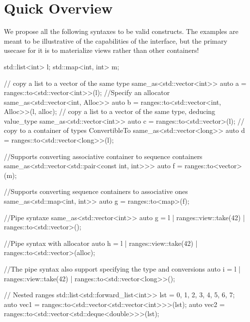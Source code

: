 \documentclass{wg21}
\begin{document}
\section{Quick Overview}
We propose all the following syntaxes to be valid constructs.
The examples are meant to be illustrative of the capabilities of the interface, but the primary usecase for it is to materialize views rather than other containers!

\begin{colorblock}
std::list<int>  l;
std::map<int, int> m;

// copy a list to a vector of the same type
same_as<std::vector<int>> auto a = ranges::to<std::vector<int>>(l);
//Specify an allocator
same_as<std::vector<int, Alloc>> auto b = ranges::to<std::vector<int, Alloc>>(l, alloc);
// copy a list to a vector of the same type, deducing value_type
same_as<std::vector<int>> auto c = ranges::to<std::vector>(l);
// copy to a container of types ConvertibleTo
same_as<std::vector<long>> auto d = ranges::to<std::vector<long>>(l);


//Supports converting associative container to sequence containers
same_as<std::vector<std::pair<const int, int>>> auto f = ranges::to<vector>(m);

//Supports converting sequence containers to associative ones
same_as<std::map<int, int>> auto g = ranges::to<map>(f);

//Pipe syntaxe
same_as<std::vector<int>> auto g = l | ranges::view::take(42) | ranges::to<std::vector>();

//Pipe syntax with allocator
auto h = l | ranges::view::take(42) | ranges::to<std::vector>(alloc);

//The pipe syntax also support specifying the type and conversions
auto i = l | ranges::view::take(42) | ranges::to<std::vector<long>>();

// Nested ranges
std::list<std::forward_list<int>> lst = {{0, 1, 2, 3}, {4, 5, 6, 7}};
auto vec1 = ranges::to<std::vector<std::vector<int>>>(lst);
auto vec2 = ranges::to<std::vector<std::deque<double>>>(lst);

\end{colorblock}
\end{document}
